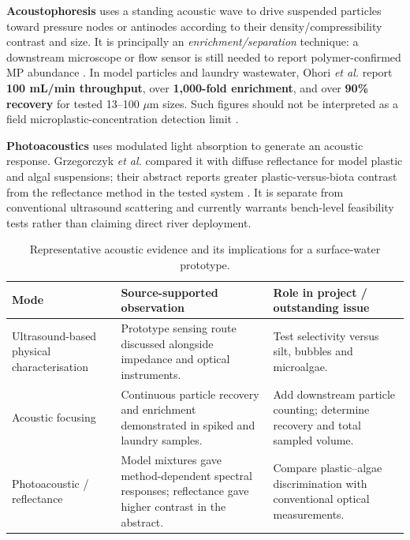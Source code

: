 \documentclass[10pt,a4paper]{article}
\begin{document}
\textbf{Acoustophoresis} uses a standing acoustic wave to drive suspended particles toward pressure nodes or antinodes according to their density/compressibility contrast and size. It is principally an \emph{enrichment/separation} technique: a downstream microscope or flow sensor is still needed to report polymer-confirmed MP abundance \cite{Blevins2021,Ohori2025}. In model particles and laundry wastewater, Ohori \emph{et al.} report \textbf{100 mL/min throughput}, over \textbf{1,000-fold enrichment}, and over \textbf{90\% recovery} for tested 13--100 $\mu$m sizes. Such figures should not be interpreted as a field microplastic-concentration detection limit \cite{Ohori2025}.

\textbf{Photoacoustics} uses modulated light absorption to generate an acoustic response. Grzegorczyk \emph{et al.} compared it with diffuse reflectance for model plastic and algal suspensions; their abstract reports greater plastic-versus-biota contrast from the reflectance method in the tested system \cite{Grzegorczyk2022}. It is separate from conventional ultrasound scattering and currently warrants bench-level feasibility tests rather than claiming direct river deployment.

\begin{table}[H]\centering\footnotesize
\caption{Representative acoustic evidence and its implications for a surface-water prototype.}\label{tab:acoustic}
\begin{tabularx}{\linewidth}{@{}p{2.65cm}X X@{}}\toprule
Mode & Source-supported observation & Role in project / outstanding issue \\\midrule
Ultrasound-based physical characterisation \cite{Blevins2021} & Prototype sensing route discussed alongside impedance and optical instruments. & Test selectivity versus silt, bubbles and microalgae. \\
Acoustic focusing \cite{Ohori2025} & Continuous particle recovery and enrichment demonstrated in spiked and laundry samples. & Add downstream particle counting; determine recovery and total sampled volume. \\
Photoacoustic / reflectance \cite{Grzegorczyk2022} & Model mixtures gave method-dependent spectral responses; reflectance gave higher contrast in the abstract. & Compare plastic--algae discrimination with conventional optical measurements. \\
\bottomrule\end{tabularx}
\end{table}
\end{document}
